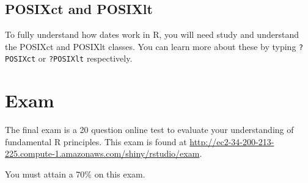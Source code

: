 \documentclass[]{book}
\begin{document}
\section{POSIXct and POSIXlt}\label{posixct-and-posixlt}

To fully understand how dates work in R, you will need study and
understand the POSIXct and POSIXlt classes. You can learn more about
these by typing \texttt{?POSIXct} or \texttt{?POSIXlt} respectively.

\chapter{Exam}\label{exam}

The final exam is a 20 question online test to evaluate your
understanding of fundamental R principles. This exam is found at
\url{http://ec2-34-200-213-225.compute-1.amazonaws.com/shiny/rstudio/exam}.

You must attain a 70\% on this exam.


\end{document}
